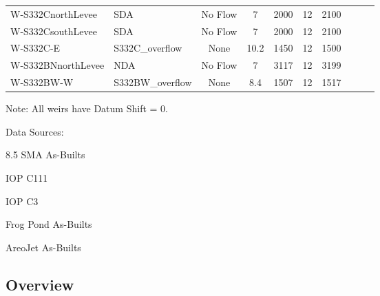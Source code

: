 \begin{table}[!h]
\begin{tabular}{llcccccccc}
W-S332CnorthLevee & SDA              & No Flow   &  7      & 2000    & 12    & 2100  &           &            \\
W-S332CsouthLevee & SDA              & No Flow   &  7      & 2000    & 12    & 2100  &           &            \\
W-S332C-E         & S332C\_overflow  & None      &  10.2   & 1450    & 12    & 1500  &           &            \\
W-S332BNnorthLevee& NDA              & No Flow   &  7      & 3117    & 12    & 3199  &           &            \\
W-S332BW-W        & S332BW\_overflow & None      &  8.4    & 1507    & 12    & 1517  &           &            \\
\hline
\end{tabular}

Note: All weirs have Datum Shift = 0.

Data Sources:

8.5 SMA As-Builts

IOP C111

IOP C3

Frog Pond As-Builts

AreoJet As-Builts

\end{table}



\subsection{Overview}

\cleardoublepage
